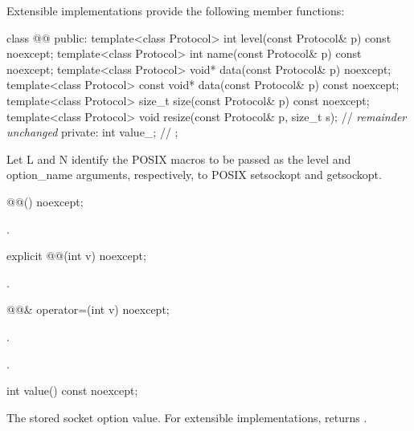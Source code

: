 \pnum
 Extensible implementations provide the following member functions:

\begin{codeblock}
class @@
{
public:
  template<class Protocol> int level(const Protocol& p) const noexcept;
  template<class Protocol> int name(const Protocol& p) const noexcept;
  template<class Protocol> void* data(const Protocol& p) noexcept;
  template<class Protocol> const void* data(const Protocol& p) const noexcept;
  template<class Protocol> size_t size(const Protocol& p) const noexcept;
  template<class Protocol> void resize(const Protocol& p, size_t s);
  // \textit{remainder unchanged}
private:
  int value_; // \expos
};
\end{codeblock}

\pnum
Let L and N identify the POSIX macros to be passed as the level and option_name arguments, respectively, to POSIX setsockopt and getsockopt.

\begin{itemdecl}
@@() noexcept;
\end{itemdecl}

\begin{itemdescr}
\pnum
\postconditions {}.
\end{itemdescr}

\begin{itemdecl}
explicit @@(int v) noexcept;
\end{itemdecl}

\begin{itemdescr}
\pnum
\postconditions {}.
\end{itemdescr}

\begin{itemdecl}
@@& operator=(int v) noexcept;
\end{itemdecl}

\begin{itemdescr}
\pnum
\returns {}.

\pnum
\postconditions {}.
\end{itemdescr}

\begin{itemdecl}
int value() const noexcept;
\end{itemdecl}

\begin{itemdescr}
\pnum
\returns The stored socket option value. For extensible implementations, returns .
\end{itemdescr}

